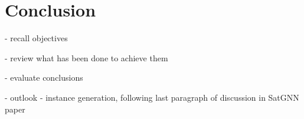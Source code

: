 % 

\chapter*{Conclusion}\label{conclusion}

- recall objectives

- review what has been done to achieve them

- evaluate conclusions

- outlook
    - instance generation, following last paragraph of discussion in SatGNN paper

